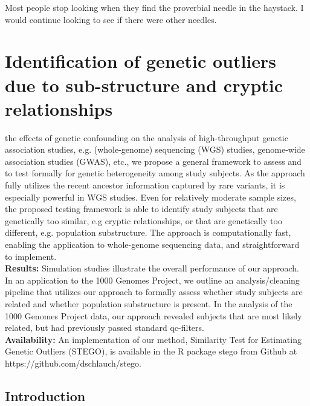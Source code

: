 \begin{savequote}[75mm]
Most people stop looking when they find the proverbial needle in the haystack. I would continue looking to see if there were other needles.
\end{savequote}

\chapter{Identification of genetic outliers due to sub-structure and cryptic relationships}

 the effects of genetic confounding on the analysis of high-throughput genetic association studies, e.g. (whole-genome) sequencing (WGS) studies, genome-wide association studies (GWAS), etc., we propose a general framework to assess and to test formally for genetic heterogeneity among study subjects. As the approach fully utilizes the recent ancestor information captured by rare variants, it is especially powerful in WGS studies. Even for relatively moderate sample sizes, the proposed testing framework is able to identify study subjects that are genetically too similar, e.g cryptic relationships, or that are genetically too different, e.g. population substructure. The approach is computationally fast, enabling the application to whole-genome sequencing data, and straightforward to implement.\\
 \textbf{Results:} Simulation studies illustrate the overall performance of our approach. In an application to the 1000 Genomes Project, we outline an analysis/cleaning pipeline that utilizes our approach to formally assess whether study subjects are related and whether population substructure is present. In the analysis of the 1000 Genomes Project data, our approach revealed subjects that are most likely related, but had previously passed standard qc-filters. \\
\textbf{Availability:} An implementation of our method, Similarity Test for Estimating Genetic Outliers (STEGO), is available in the R package stego from Github at \\ https://github.com/dschlauch/stego.


\section{Introduction}

